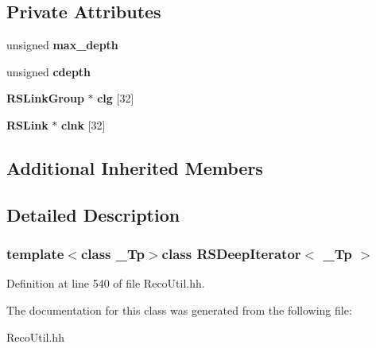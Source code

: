 \subsection*{Private Attributes}
\begin{DoxyCompactItemize}
\item 
unsigned {\bfseries max\-\_\-depth}\label{classRSDeepIterator_ac7e35d0bc6564ced0fba22e897de2077}

\item 
unsigned {\bfseries cdepth}\label{classRSDeepIterator_ab9649bd60bd774285389d9e58aa7433f}

\item 
{\bf R\-S\-Link\-Group} $\ast$ {\bfseries clg} [32]\label{classRSDeepIterator_ada447dc246ba74d344c20dec4d706345}

\item 
{\bf R\-S\-Link} $\ast$ {\bfseries clnk} [32]\label{classRSDeepIterator_a3c744e3562ff2491e8c4c95e7153cfab}

\end{DoxyCompactItemize}
\subsection*{Additional Inherited Members}


\subsection{Detailed Description}
\subsubsection*{template$<$class \-\_\-\-Tp$>$class R\-S\-Deep\-Iterator$<$ \-\_\-\-Tp $>$}



Definition at line 540 of file Reco\-Util.\-hh.



The documentation for this class was generated from the following file\-:\begin{DoxyCompactItemize}
\item 
Reco\-Util.\-hh\end{DoxyCompactItemize}
